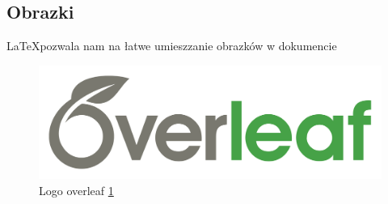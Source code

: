 \documentclass{article}
\begin{document}
\subsection{Obrazki}
\LaTeX pozwala nam na łatwe umieszzanie obrazków w dokumencie
\begin{figure}[htbp]
    \centering
    \includegraphics[scale=0.25]{images/logo.png}
    \caption{Logo overleaf \ref{fig:logo}}
    \label{fig:logo}
\end{figure}



\end{document}
